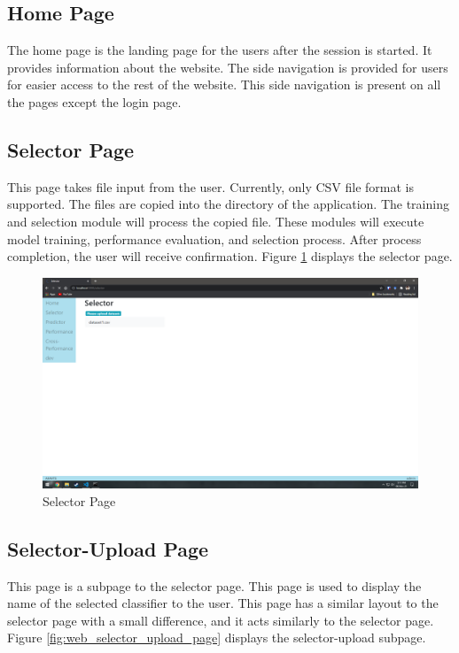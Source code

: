 \subsection{Home Page} \label{subsec:home_page}
The home page is the landing page for the users after the session is started. It provides
information about the website. The side navigation is provided for users for easier access to
the rest of the website. This side navigation is present on all the pages except the login
page.

\subsection{Selector Page} \label{subsec:selector_page}
This page takes file input from the user. Currently, only CSV file format is supported. The
files are copied into the directory of the application. The training and selection module will
process the copied file. These modules will execute model training, performance evaluation, and
selection process. After process completion, the user will receive confirmation. Figure
\ref{fig:web_selector_page} displays the selector page.

\begin{figure}[H]
    \centering
    \includegraphics[width=0.7\columnwidth]{media/website/pages/02_selector.png}
    \caption{Selector Page}
    \label{fig:web_selector_page}
\end{figure}

\subsection{Selector-Upload Page} \label{subsec:selector_upload_page}
This page is a subpage to the selector page. This page is used to display the name of the
selected classifier to the user. This page has a similar layout to the selector page with a
small difference, and it acts similarly to the selector page. Figure
\ref{fig:web_selector_upload_page} displays the selector-upload subpage.


